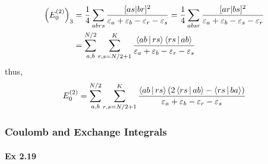 \documentclass[a4paper]{article}
\newcommand{\ex}[1]{\paragraph{Ex #1}}
\numberwithin{equation}{subsection}
\begin{document}
\begin{equation}\label{key}
\begin{aligned}
\qty(E_0^{(2)})_3 &= \dfrac{1}{4}\sum_{abrs} \dfrac{[as|br]^2}{\varepsilon_a+\varepsilon_b-\varepsilon_r-\varepsilon_s} = \dfrac{1}{4}\sum_{absr}\dfrac{[ar|bs]^2}{\varepsilon_a+\varepsilon_b-\varepsilon_s-\varepsilon_r}\\
&= \sum_{a,b}^{N/2}\sum_{r,s=N/2+1}^K \dfrac{\Braket{ab|rs}\Braket{rs|ab}}{\varepsilon_a+\varepsilon_b-\varepsilon_r-\varepsilon_s}
\end{aligned}
\end{equation}
thus,
\begin{equation}\label{key}
E_0^{(2)} = \sum_{a,b}^{N/2}\sum_{r,s=N/2+1}^K \dfrac{\Braket{ab|rs}(2\Braket{rs|ab} - \Braket{rs|ba})}{\varepsilon_a+\varepsilon_b-\varepsilon_r-\varepsilon_s}
\end{equation}

\subsubsection{Coulomb and Exchange Integrals}
\ex{2.19}
\end{document}
